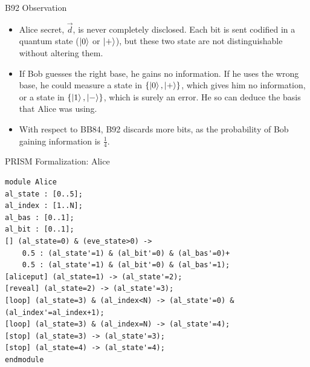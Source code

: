 \documentclass{beamer}
\begin{document}
\begin{frame}{B92 Observation}

\begin{itemize}
\item Alice secret, $\vec{d}$, is never completely disclosed. Each bit is sent codified in a quantum state ($\ket{0}$ or $\ket{+}$), but these two state are not distinguishable without altering them.

\item If Bob guesses the right base, he gains no information. If he uses the wrong base, he could measure a state in $\{\ket{0}, \ket{+}\}$, which gives him no information, or a state in $\{\ket{1}, \ket{-}\}$, which is surely an error. He so can deduce the basis that Alice was using.

\item With respect to BB84, B92 discards more bits, as the probability of Bob gaining information is $\frac{1}{4}$.
\end{itemize}

\end{frame}

\begin{frame}[fragile]{PRISM Formalization: Alice}
\begin{scriptsize}
\begin{verbatim}
module Alice
al_state : [0..5];
al_index : [1..N];
al_bas : [0..1];
al_bit : [0..1];
[] (al_state=0) & (eve_state>0) -> 
	0.5 : (al_state'=1) & (al_bit'=0) & (al_bas'=0)+
	0.5 : (al_state'=1) & (al_bit'=0) & (al_bas'=1);
[aliceput] (al_state=1) -> (al_state'=2);
[reveal] (al_state=2) -> (al_state'=3);
[loop] (al_state=3) & (al_index<N) -> (al_state'=0) & (al_index'=al_index+1);
[loop] (al_state=3) & (al_index=N) -> (al_state'=4);
[stop] (al_state=3) -> (al_state'=3);
[stop] (al_state=4) -> (al_state'=4);
endmodule
\end{verbatim}
\end{scriptsize}
\end{frame}
\end{document}
